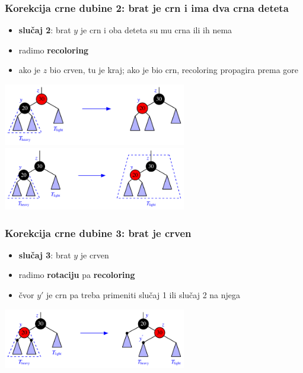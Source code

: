 \documentclass[compress,aspectratio=169]{beamer}
\begin{document}
\begin{frame}[fragile]
  \frametitle{Korekcija crne dubine 2: brat je crn i ima dva crna deteta}  
  \begin{itemize}
    \item \textbf{slučaj 2}: brat $y$ je crn i oba deteta su mu crna ili ih nema
    \item radimo \textbf{recoloring}
    \item ako je $z$ bio crven, tu je kraj; ako je bio crn, recoloring propagira prema gore
  \end{itemize}
  \begin{center}
    \includegraphics[width=8cm]{asp-11-pic43a.pdf} \\
    \includegraphics[width=8cm]{asp-11-pic43b.pdf} \\
  \end{center}
\end{frame}

\begin{frame}[fragile]
  \frametitle{Korekcija crne dubine 3: brat je crven}
  \begin{itemize}
    \item \textbf{slučaj 3}: brat $y$ je crven
    \item radimo \textbf{rotaciju} pa \textbf{recoloring}
    \item čvor $y'$ je crn pa treba primeniti slučaj 1 ili slučaj 2 na njega
  \end{itemize}
  \begin{center}
    \includegraphics[width=8cm]{asp-11-pic44.pdf}
  \end{center}
\end{frame}
\end{document}
